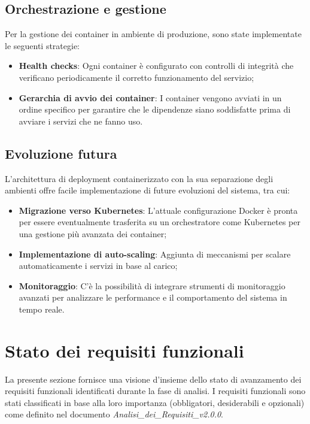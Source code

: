 \documentclass[10pt]{article}
\begin{document}
\subsection{Orchestrazione e gestione}
Per la gestione dei container in ambiente di produzione, sono state implementate le seguenti strategie:

\begin{itemize}
    \item \textbf{Health checks}: Ogni container è configurato con controlli di integrità che verificano periodicamente il corretto funzionamento del servizio;
    \item \textbf{Gerarchia di avvio dei container}: I container vengono avviati in un ordine specifico per garantire che le dipendenze siano soddisfatte prima di avviare i servizi che ne fanno uso.
\end{itemize}

\subsection{Evoluzione futura}
L'architettura di deployment containerizzato con la sua separazione degli ambienti offre facile implementazione di future evoluzioni del sistema, tra cui:

\begin{itemize}
    \item \textbf{Migrazione verso Kubernetes}: L'attuale configurazione Docker è pronta per essere eventualmente trasferita su un orchestratore come Kubernetes per una gestione più avanzata dei container;
    \item \textbf{Implementazione di auto-scaling}: Aggiunta di meccanismi per scalare automaticamente i servizi in base al carico;
    \item \textbf{Monitoraggio}: C'è la possibilità di integrare strumenti di monitoraggio avanzati per analizzare le performance e il comportamento del sistema in tempo reale.
\end{itemize}

\newpage

\section{Stato dei requisiti funzionali}

La presente sezione fornisce una visione d'insieme dello stato di avanzamento dei requisiti funzionali identificati durante la fase di analisi. I requisiti funzionali sono stati classificati in base alla loro importanza (obbligatori, desiderabili e opzionali) come definito nel documento \textit{Analisi\_dei\_Requisiti\_v2.0.0}.
\end{document}
